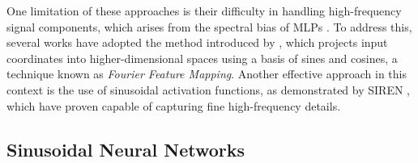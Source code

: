



One limitation of these approaches is their difficulty in handling high-frequency signal components, which arises from the spectral bias of MLPs \citep{rahaman2018spectral}. To address this, several works have adopted the method introduced by \cite{tancik2020fourfeat}, which projects input coordinates into higher-dimensional spaces using a basis of sines and cosines, a technique known as \textit{Fourier Feature Mapping}. Another effective approach in this context is the use of sinusoidal activation functions, as demonstrated by SIREN \citep{sitzmann2019siren}, which have proven capable of capturing fine high-frequency details.


\subsection{Sinusoidal Neural Networks}

